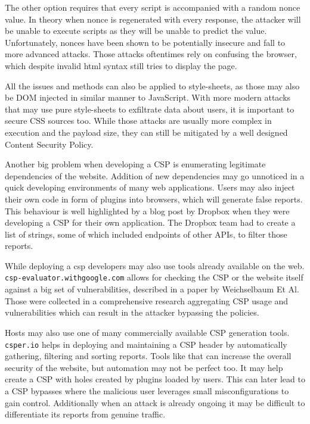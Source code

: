 The other option requires that every script is accompanied with a random nonce value.
In theory when nonce is regenerated with every response, the attacker will be unable to execute scripts as they will be unable to predict the value.
Unfortunately, nonces have been shown to be potentially insecure and fall to more advanced attacks. \cite{noncesGoBrrr}
Those attacks oftentimes rely on confusing the browser, which despite invalid html syntax still tries to display the page.

All the issues and methods can also be applied to style-sheets, as those may also be DOM injected in similar manner to JavaScript. \cite{cssinjection} \cite{cssexfil}
With more modern attacks that may use pure style-sheets to exfiltrate data about users, it is important to secure CSS sources too.
While those attacks are usually more complex in execution and the payload size, they can still be mitigated by a well designed Content Security Policy.

Another big problem when developing a CSP is enumerating legitimate dependencies of the website.
Addition of new dependencies may go unnoticed in a quick developing environments of many web applications.
Users may also inject their own code in form of plugins into browsers, which will generate false reports.
This behaviour is well highlighted by a blog post by Dropbox when they were developing a CSP for their own application. \cite{dropboxcsp}
The Dropbox team had to create a list of strings, some of which included endpoints of other APIs, to filter those reports.

While deploying a csp developers may also use tools already available on the web. \\ 
\texttt{csp-evaluator.withgoogle.com} allows for checking the CSP or the website itself against a big set of vulnerabilities, described in a paper by Weichselbaum Et Al. \cite{weichselbaum2016csp}
Those were collected in a comprehensive research aggregating CSP usage and vulnerabilities which can result in the attacker bypassing the policies.

Hosts may also use one of many commercially available CSP generation tools.
\texttt{csper.io} helps in deploying and maintaining a CSP header by automatically gathering, filtering and sorting reports. 
Tools like that can increase the overall security of the website, but automation may not be perfect too. 
It may help create a CSP with holes created by plugins loaded by users.
This can later lead to a CSP bypasses where the malicious user leverages small misconfigurations to gain control.
Additionally when an attack is already ongoing it may be difficult to differentiate its reports from genuine traffic.

